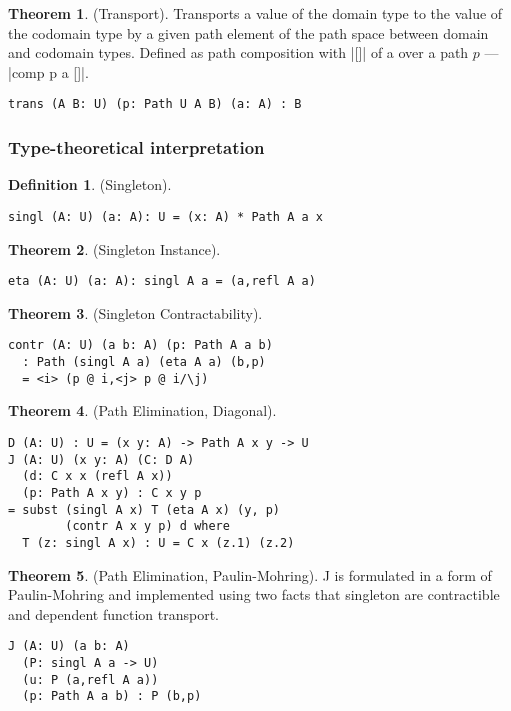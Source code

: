 \documentclass{article}
\theoremstyle{definition}
\newtheorem{theorem}{Theorem}
\newtheorem{definition}{Definition}
\begin{document}
\begin{theorem} (Transport).
Transports a value of the domain type to the value of the codomain type
by a given path element of the path space between domain and codomain types.
Defined as path composition with |[]| of a over a path $p$ --- |comp p a []|.
\begin{lstlisting}
trans (A B: U) (p: Path U A B) (a: A) : B
\end{lstlisting}
\end{theorem}

\subsubsection*{Type-theoretical interpretation}
\begin{definition} (Singleton).
\begin{lstlisting}
singl (A: U) (a: A): U = (x: A) * Path A a x
\end{lstlisting}
\end{definition}

\begin{theorem} (Singleton Instance).
\begin{lstlisting}
eta (A: U) (a: A): singl A a = (a,refl A a)
\end{lstlisting}
\end{theorem}

\begin{theorem} (Singleton Contractability).
\begin{lstlisting}
contr (A: U) (a b: A) (p: Path A a b)
  : Path (singl A a) (eta A a) (b,p)
  = <i> (p @ i,<j> p @ i/\j)
\end{lstlisting}
\end{theorem}

\begin{theorem} (Path Elimination, Diagonal).
\begin{lstlisting}
D (A: U) : U = (x y: A) -> Path A x y -> U
J (A: U) (x y: A) (C: D A)
  (d: C x x (refl A x))
  (p: Path A x y) : C x y p
= subst (singl A x) T (eta A x) (y, p)
        (contr A x y p) d where
  T (z: singl A x) : U = C x (z.1) (z.2)
\end{lstlisting}
\end{theorem}

\begin{theorem} (Path Elimination, Paulin-Mohring).
J is formulated in a form of Paulin-Mohring and implemented using
two facts that singleton are contractible and dependent function
transport.
\begin{lstlisting}
J (A: U) (a b: A)
  (P: singl A a -> U)
  (u: P (a,refl A a))
  (p: Path A a b) : P (b,p)
\end{lstlisting}
\end{theorem}
\end{document}
